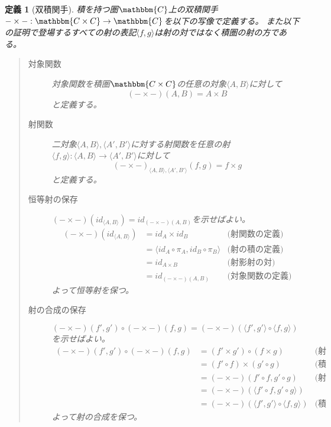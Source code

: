 \documentclass[dvipdfmx]{jsarticle}
\newcommand{\cat}[1]{\mathbbm{#1}}
\newcommand{\arrow}{\rightarrow}
\newcommand{\functor}[3]{#1:\cat{#2}\arrow \cat{#3}}
\newcommand{\tuple}[1]{\langle #1\rangle}
\newcommand{\mor}[3]{#1:#2\arrow #3}
\newtheorem{define}{定義}[section]
\numberwithin{proof}{subsection}
\numberwithin{prop}{subsection}
\numberwithin{define}{subsection}
\begin{document}
	\begin{define}[双積関手]
		積を持つ圏$\cat{C}$上の双積関手$\functor{-\times -}{C\times C}{C}$を以下の写像で定義する。
		また以下の証明で登場するすべての射の表記$\tuple{f,g}$は射の対ではなく積圏の射の方である。
		\begin{quote}
			\begin{description}
				\item[対象関数] 対象関数を積圏$\cat{C\times C}$の任意の対象$\tuple{A,B}$に対して\[(-\times -)(A,B)=A\times B\]と定義する。
				\item[射関数] 二対象$\tuple{A,B},\tuple{A',B'}$に対する射関数を任意の射$\mor{\tuple{f,g}}{\tuple{A,B}}{\tuple{A',B'}}$に対して\[(-\times -)_{\tuple{A,B},\tuple{A',B'}}(f,g)=f\times g\]と定義する。
				\begin{center}
				\end{center}

				\item[恒等射の保存] $(-\times -)(id_{\tuple{A,B}})=id_{(-\times-)(A,B)}$を示せばよい。
				\begin{align*}
					(-\times -)(id_{\tuple{A,B}})&=id_A\times id_B&\text{(射関数の定義)}\\
					&=\tuple{id_A\circ\pi_A,id_B\circ\pi_B}&\text{(射の積の定義)}\\
					&=id_{A\times B}&\text{(射影射の対)}\\
					&=id_{(-\times-)(A,B)}&\text{(対象関数の定義)}
				\end{align*}
				よって恒等射を保つ。
				\item[射の合成の保存] $(-\times -)(f',g')\circ(-\times-)(f,g)=(-\times-)(\tuple{f',g'}\circ\tuple{f,g})$を示せばよい。
				\begin{align*}
					(-\times -)(f',g')\circ(-\times-)(f,g)&=(f'\times g')\circ(f\times g)&\text{(射関数の定義)}\\
					&=(f'\circ f)\times(g'\circ g)&\text{(積と合成の交換)}\\
					&=(-\times-)(f'\circ f,g'\circ g)&\text{(射関数の定義)}\\
					&=(-\times-)(\tuple{f'\circ f,g'\circ g})\\
					&=(-\times-)(\tuple{f',g'}\circ\tuple{f,g})&\text{(積圏の射の合成の定義)}
				\end{align*}
				よって射の合成を保つ。
			\end{description}
		\end{quote}
	\end{define}
\end{document}
